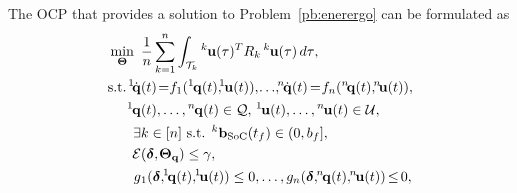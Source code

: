 \documentclass[letterpaper,10pt,conference,twoside]{IEEEtran}
\theoremstyle{definition}
\begin{document}
The OCP that provides a solution to Problem~\ref{pb:enerergo} can be formulated as
\begin{subequations}\label{eq:ocpfinal}\begin{align}
  \min_{\boldsymbol{\Theta}}\,\,\,&{\frac{1}{n}\sum_{k=1}^{n}\int_{\mathcal{T}_k}{}^k\hspace*{-.1ex}\mathbf{u}(\tau)^TR_k\,{}^k\hspace*{-.1ex}\mathbf{u}(\tau)\,d\tau},\label{eq:ocpfinalcost}\\
  \text{\hspace*{.2ex}s.t.\hspace*{.3ex}}{}^1\hspace*{-.4ex}\dot{\mathbf{q}}&(t)\hspace*{-.4ex}=\hspace*{-.6ex}f_1({}^1\hspace*{-.2ex}\mathbf{q}(t),\hspace*{-.8ex}{}^1\hspace*{-.2ex}\mathbf{u}(t)),\hspace*{-.3ex}{\small\dots},\hspace*{-.7ex}{}^n\hspace*{-.3ex}\dot{\mathbf{q}}(t)\hspace*{-.3ex}=\hspace*{-.5ex}f_n({}^n\hspace*{-.4ex}\mathbf{q}(t),\hspace*{-.7ex}{}^n\hspace*{-.4ex}\mathbf{u}(t)),\\
  {}^1\hspace*{-.2ex}\mathbf{q}&(t),\dots,{}^n\hspace*{-.2ex}\mathbf{q}(t)\in\mathcal{Q},\,{}^1\hspace*{-.2ex}\mathbf{u}(t),\dots,{}^n\hspace*{-.2ex}\mathbf{u}(t)\in\mathcal{U},\\
  \exists &k\in[n]\text{ s.t. }{}^k\mathbf{b}_{\text{SoC}}(t_f)\in(0,b_f],\label{eq:battconst}\\
  \mathcal{E}&(\boldsymbol{\delta},\hspace*{-.2ex}\boldsymbol{\Theta}_{\mathbf{q}})\leq\gamma,\label{eq:ergoconst}\\
  g&{}_1(\boldsymbol{\delta},\hspace*{-.6ex}{}^1\hspace*{-.3ex}\mathbf{q}(t),\hspace*{-.6ex}{}^1\hspace*{-.3ex}\mathbf{u}(t))\leq 0,\dots,g_n(\boldsymbol{\delta},\hspace*{-.6ex}{}^n\hspace*{-.3ex}\mathbf{q}(t),\hspace*{-.6ex}{}^n\hspace*{-.3ex}\mathbf{u}(t))\hspace*{-.3ex}\leq\hspace*{-.3ex}0,\label{eq:ocpfinalextra1}\\

\end{align}
\end{subequations}
\end{document}
